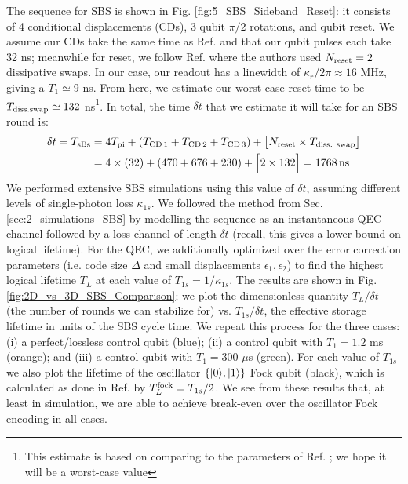 \noindent The sequence for SBS is shown in Fig. \ref{fig:5_SBS_Sideband_Reset}: it consists of 4 conditional displacements (CDs), 3 qubit $\pi/2$ rotations, and qubit reset. We assume our CDs take the same time as Ref. \cite{sivak2023gkp-expt} and that our qubit pulses each take 32 ns; meanwhile for reset, we follow Ref. \cite{nordquantique2023gkp-expt} where the authors used $N_{\rm reset} = 2$ dissipative swaps. In our case, our readout has a linewidth of $\kappa_r / 2\pi \approx 16$ MHz, giving a $T_1 \simeq 9$ ns. From here, we estimate our worst case reset time to be $T_{\rm diss. swap} \simeq 132$ ns\footnote{This estimate is based on comparing to the parameters of Ref. \cite{nordquantique2023gkp-expt}; we hope it will be a worst-case value}. In total, the time $\delta t$ that we estimate it will take for an SBS round is:
\begin{align*}
\delta t = T_{\rm sBs}  &= 4T_{\rm pi} + (T_{\rm CD\,1} + T_{\rm CD\,2} + T_{\rm CD\,3}) + \big[N_{\text{reset}}\times T_{\text{diss. swap}}\big] \\ &= 4\times (32) + (470 + 676 + 230) + \Big[2 \times 132\Big] = 1768\, {\rm ns}
\end{align*}
We performed extensive SBS simulations using this value of $\delta t$, assuming different levels of single-photon loss $\kappa_{1s}$. We followed the method from Sec. \ref{sec:2_simulations_SBS} by modelling the sequence as an instantaneous QEC channel followed by a loss channel of length $\delta t$ (recall, this gives a lower bound on logical lifetime). For the QEC, we additionally optimized over the error correction parameters (i.e. code size $\Delta$ and small displacements $\epsilon_1, \epsilon_2$) to find the highest logical lifetime $T_L$ at each value of $T_{1s} = 1/\kappa_{1s}$. The results are shown in Fig. \ref{fig:2D_vs_3D_SBS_Comparison}; we plot the dimensionless quantity $T_L/\delta t$ (the number of rounds we can stabilize for) vs. $T_{1s}/\delta t$, the effective storage lifetime in units of the SBS cycle time. We repeat this process for the three cases: (i) a perfect/lossless control qubit (blue); (ii) a control qubit with $T_1 = 1.2$ ms (orange); and (iii) a control qubit with $T_1 = 300$ $\mu$s (green). For each value of $T_{1s}$ we also plot the lifetime of the oscillator $\{\lvert0\rangle, \lvert1\rangle\}$ Fock qubit (black), which is calculated as done in Ref. \cite{royer2020gkp} by $T_L^{\rm fock} = T_{1s}/2$. We see from these results that, at least in simulation, we are able to achieve break-even over the oscillator Fock encoding in all cases. 

